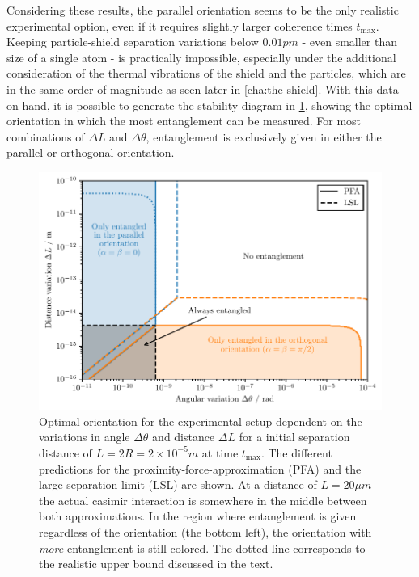 Considering these results, the parallel orientation seems to be the only realistic experimental option, even if it requires slightly larger coherence times $t_\mathrm{max}$.
Keeping particle-shield separation variations below $0.01\si{pm}$ - even smaller than size of a single atom - is practically impossible,  
especially under the additional consideration of the thermal vibrations of the shield and the particles, which are in the same order of magnitude as seen later in \cref{cha:the-shield}.
With this data on hand, it is possible to generate the stability diagram in \cref{fig:4:optimal-orientation}, showing the optimal orientation in which the most entanglement can be measured.
For most combinations of $\Delta L$ and $\Delta \theta$, entanglement is exclusively given in either the parallel or orthogonal orientation.
\begin{figure}[!htbp]
  \centering
  \includegraphics[width=\textwidth]{./../figures/optimize/optimized-orientation-advanced.pdf}
  \caption{Optimal orientation for the experimental setup dependent on the variations in angle $\Delta\theta$ and distance $\Delta L$ for a initial separation distance of $L=2R=2\times 10^{-5}\si{m}$ at time $t_\mathrm{max}$. The different predictions for the proximity-force-approximation (PFA) and the large-separation-limit (LSL) are shown. At a distance of $L=20\si{\mu m}$ the actual casimir interaction is somewhere in the middle between both approximations. In the region where entanglement is given regardless of the orientation (the bottom left), the orientation with \textit{more} entanglement is still colored. The dotted line corresponds to the realistic upper bound discussed in the text.}
  \label{fig:4:optimal-orientation}
\end{figure}



